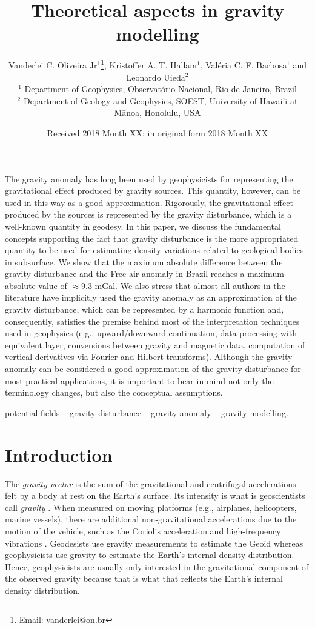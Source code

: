 \documentclass[extra]{gji}
\title[Theoretical aspects in gravity modelling]
      {Theoretical aspects in gravity modelling}
\author[Oliveira Jr et al.]
{Vanderlei C. Oliveira Jr$^1$\thanks{Email: vanderlei@on.br},
Kristoffer A. T. Hallam$^{1}$, Val\'{e}ria C. F. Barbosa$^1$
and Leonardo Uieda$^2$ \\
$^1$ Department of Geophysics, Observat\'{o}rio Nacional, Rio de Janeiro, Brazil \\
$^2$ Department of Geology and Geophysics, SOEST, University of Hawai'i at M\={a}noa, Honolulu, USA
}
\date{Received 2018 Month XX; in original form 2018 Month XX}
\begin{document}
\label{firstpage}

\maketitle


\begin{summary}
 The gravity anomaly has long been used by geophysicists for
 representing the gravitational effect produced by gravity
 sources. This quantity, however, can be used in this way as a good
 approximation. Rigorously, the gravitational effect produced by the sources
 is represented by the gravity disturbance, which is a well-known
 quantity in geodesy.
 In this paper, we discuss the fundamental concepts supporting
 the fact that gravity disturbance is the more appropriated quantity
 to be used for estimating density variations related to geological
 bodies in subsurface. We show that the maximum absolute difference
 between the gravity disturbance and the Free-air anomaly in Brazil
 reaches a maximum absolute value of $\approx 9.3$ mGal. We also stress
 that almost all authors in the literature have implicitly used the
 gravity anomaly as an approximation of the gravity disturbance,
 which can be represented by a harmonic function and, consequently,
 satisfies the premise behind most of
 the interpretation techniques used in geophysics (e.g.,
 upward/downward continuation, data processing with equivalent layer,
 conversions between gravity and magnetic data, computation of vertical
 derivatives via Fourier and Hilbert transforms).
 Although the gravity anomaly can be considered a good approximation of the
 gravity disturbance for most practical applications,
 it is important to bear in mind not only the terminology
 changes, but also the conceptual assumptions.

\end{summary}

\begin{keywords}
 potential fields -- gravity disturbance -- gravity anomaly -- gravity modelling.
\end{keywords}


\section{Introduction}

The \textit{gravity vector} is the sum of the gravitational and centrifugal
accelerations felt by a body at rest on the Earth's surface.
Its intensity is what is geoscientists call \textit{gravity}
\citep{heiskanen-moritz1967, hofmann-wellenhof-moritz2005}.
When measured on moving platforms (e.g., airplanes,
helicopters, marine vessels), there are additional
non-gravitational accelerations due to the motion of the vehicle,
such as the Coriolis acceleration and high-frequency vibrations
\citep{glennie-etal2000,nabighian-etal2005-grav,baumann-etal2012}.
Geodesists use gravity measurements to estimate the Geoid \citep{li2001}
whereas geophysicists use gravity to estimate the Earth's
internal density distribution.
Hence, geophysicists are usually only interested
in the gravitational component of the observed gravity
because that is what that reflects the Earth's internal density distribution.
\end{document}
